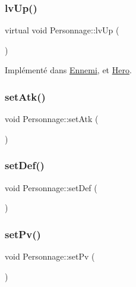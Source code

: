 \mbox{\label{classPersonnage_acdbb926ead0cf6f0b919e72148b02f6d}} 
\subsubsection{\texorpdfstring{lv\+Up()}{lvUp()}}
{\footnotesize\ttfamily virtual void Personnage\+::lv\+Up (\begin{DoxyParamCaption}{ }\end{DoxyParamCaption})\hspace{0.3cm}{\ttfamily [pure virtual]}}



Implémenté dans \hyperlink{classEnnemi_a36d244231657f4901ed23a7046f614a1}{Ennemi}, et \hyperlink{classHero_af49c7f895ca52c04d8a9c7bd7fae96b5}{Hero}.

\mbox{\label{classPersonnage_a98c99ab54a98b935a86bb13b52c2e0bd}} 
\subsubsection{\texorpdfstring{set\+Atk()}{setAtk()}}
{\footnotesize\ttfamily void Personnage\+::set\+Atk (\begin{DoxyParamCaption}{ }\end{DoxyParamCaption})}

\mbox{\label{classPersonnage_ad59d8bc68772a6d133e4cabf9486a4a9}} 
\subsubsection{\texorpdfstring{set\+Def()}{setDef()}}
{\footnotesize\ttfamily void Personnage\+::set\+Def (\begin{DoxyParamCaption}{ }\end{DoxyParamCaption})}

\mbox{\label{classPersonnage_ab6a055c4cc927e63fbf93c3445c83c15}} 
\subsubsection{\texorpdfstring{set\+Pv()}{setPv()}}
{\footnotesize\ttfamily void Personnage\+::set\+Pv (\begin{DoxyParamCaption}{ }\end{DoxyParamCaption})}



